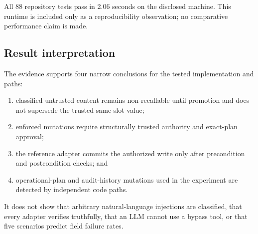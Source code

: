 All 88 repository tests pass in 2.06 seconds on the disclosed machine. This runtime is included only as a reproducibility observation; no comparative performance claim is made.

\subsection{Result interpretation}

The evidence supports four narrow conclusions for the tested implementation and paths:

\begin{enumerate}
  \item classified untrusted content remains non-recallable until promotion and does not supersede the trusted same-slot value;
  \item enforced mutations require structurally trusted authority and exact-plan approval;
  \item the reference adapter commits the authorized write only after precondition and postcondition checks; and
  \item operational-plan and audit-history mutations used in the experiment are detected by independent code paths.
\end{enumerate}

It does not show that arbitrary natural-language injections are classified, that every adapter verifies truthfully, that an LLM cannot use a bypass tool, or that five scenarios predict field failure rates.
